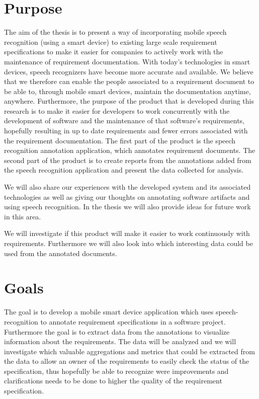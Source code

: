 \section{Purpose}
The aim of the thesis is to present a way of incorporating mobile speech recognition (using a smart device) to existing large scale requirement specifications to make it easier for companies to actively work with the maintenance of requirement documentation. With today's technologies in smart devices, speech recognizers have become more accurate and available. We believe that we therefore can enable the people associated to a requirement document to be able to, through mobile smart devices, maintain the documentation anytime, anywhere. Furthermore, the purpose of the product that is developed during this research is to make it easier for developers to work concurrently with the development of software and the maintenance of that software's requirements, hopefully resulting in up to date requirements and fewer errors associated with the requirement documentation. The first part of the product is the speech recognition annotation application, which annotates requirement documents. The second part of the product is to create reports from the annotations added from the speech recognition application and present the data collected for analysis.

We will also share our experiences with the developed system and its associated technologies as well as giving our thoughts on annotating software artifacts and using speech recognition. In the thesis we will also provide ideas for future work in this area. 

We will investigate if this product will make it easier to work continuously with requirements. Furthermore we will also look into which interesting data could be used from the annotated documents. 

\section{Goals}
The goal is to develop a mobile smart device application which uses speech-recognition to annotate requirement specifications in a software project. Furthermore the goal is to extract data from the annotations to visualize information about the requirements. The data will be analyzed and we will investigate which valuable aggregations and metrics that could be extracted from the data to allow an owner of the requirements to easily check the status of the specification, thus hopefully be able to recognize were improvements and clarifications needs to be done to higher the quality of the requirement specification.

